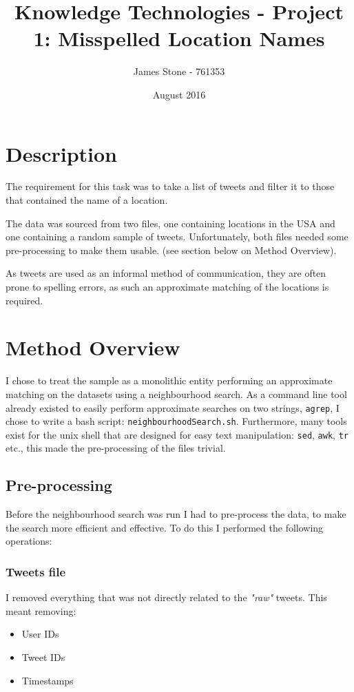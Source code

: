 \documentclass[a4paper]{article}
\title{Knowledge Technologies - Project 1: Misspelled Location Names}
\author{James Stone - 761353}
\date{August 2016}
\begin{document}
\maketitle

\section{Description}
The requirement for this task was to take a list of tweets and filter it to those that contained the name of a location.

The data was sourced from two files, one containing locations in the USA and one containing a random sample of tweets.
Unfortunately, both files needed some pre-processing to make them usable. (see section below on Method Overview).

As tweets are used as an informal method of communication, they are often prone to spelling errors, as such an approximate matching of the locations is required.
\section{Method Overview}

I chose to treat the sample as a monolithic entity performing an approximate matching on the datasets using a neighbourhood search.
As a command line tool already existed to easily perform approximate searches on two strings, \texttt{agrep}, I chose to write a bash script: \texttt{neighbourhoodSearch.sh}. Furthermore, many tools exist for the unix shell that are designed for easy text manipulation: \texttt{sed}, \texttt{awk}, \texttt{tr} etc., this made the pre-processing of the files trivial.

\subsection{Pre-processing}
Before the neighbourhood search was run I had to pre-process the data, to make the search more efficient and effective. To do this I performed the following operations:

\subsubsection{Tweets file}
I removed everything that was not directly related to the \textit{"raw"} tweets. This meant removing:
\begin{itemize}
  \item User IDs
  \item Tweet IDs
  \item Timestamps
\end{itemize}
\end{document}
